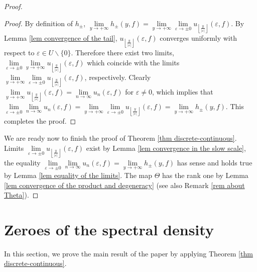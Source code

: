 \documentclass[a4paper,oneside,12pt]{amsart}
\begin{document}
\begin{proof}
\begin{proof}
By definition of $h_{\pm}$,
$\lim\limits_{y\rightarrow+\infty}h_{\pm}(y,f)
=\lim\limits_{y\rightarrow+\infty}\lim\limits_{\varepsilon\rightarrow\pm0}
u_{\left\lfloor\frac y{|\varepsilon|}\right\rfloor}(\varepsilon,f)$.
By Lemma \ref{lem convergence of the tail},
\linebreak
$u_{\left\lfloor\frac y{|\varepsilon|}\right\rfloor}(\varepsilon,f)$
converges uniformly with respect to $\varepsilon\in U\backslash\{0\}$. Therefore there exist two limits,
$\lim\limits_{\varepsilon\rightarrow\pm0}
\lim
\limits_{y\rightarrow+\infty}u_{\left\lfloor\frac y{|\varepsilon|}\right\rfloor}(\varepsilon,f)$
which coincide with the limits
$\lim\limits_{y\rightarrow+\infty}\lim\limits_{\varepsilon\rightarrow\pm0}
u_{\left\lfloor\frac y{|\varepsilon|}\right\rfloor}(\varepsilon,f)$,
respectively. Clearly
$\lim\limits_{y\rightarrow+\infty}
u_{\left\lfloor\frac y{|\varepsilon|}\right\rfloor}(\varepsilon,f)
=
\lim\limits_{n\rightarrow\infty}u_n(\varepsilon,f)$
for $\varepsilon\neq0$, which implies that $\lim\limits_{\varepsilon\rightarrow\pm0}\lim\limits_{n\rightarrow\infty}u_n(\varepsilon,f)
=
\lim\limits_{y\rightarrow+\infty}\lim\limits_{\varepsilon\rightarrow\pm0}
u_{\left\lfloor\frac y{|\varepsilon|}\right\rfloor}(\varepsilon,f)
=
\lim\limits_{y\rightarrow+\infty}h_{\pm}(y,f)$.
This completes the proof.
\end{proof}

We are ready now to finish the proof of Theorem \ref{thm discrete-continuous}. Limits $\lim\limits_{\varepsilon\rightarrow\pm0}u_{\left\lfloor\frac y{|\varepsilon|}\right\rfloor}(\varepsilon,f)$ exist by Lemma \ref{lem convergence in the slow scale}, the equality $\lim\limits_{\varepsilon\rightarrow\pm0}\lim\limits_{n\rightarrow\infty}u_n(\varepsilon,f)
=\lim\limits_{y\rightarrow+\infty}h_{\pm}(y,f)$ has sense and holds true by Lemma \ref{lem equality of the limits}. The map $\Theta$ has the rank one by Lemma \ref{lem convergence of the product and degeneracy} (see also Remark \ref{rem about Theta}).
\end{proof}

\section{Zeroes of the spectral density}\label{section result}
In this section, we prove the main result of the paper by applying Theorem \ref{thm discrete-continuous}.
\end{document}
